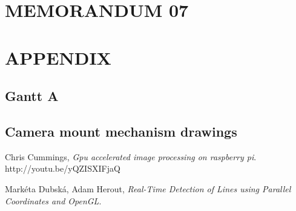 \documentclass[paper=A4, fontsize=11pt, titlepage]{article}
\numberwithin{equation}{section}
\numberwithin{figure}{section}
\numberwithin{table}{section}
\begin{document}
\section{MEMORANDUM 07}




\clearpage


\section{APPENDIX}
\subsection{Gantt A}

\subsection{Camera mount mechanism drawings}



\clearpage

\begin{thebibliography}{9}
	Chris Cummings,
	\emph{Gpu accelerated image processing on raspberry pi}. http://youtu.be/yQZISXIFjaQ

	Markéta Dubská, Adam Herout,
	\emph{Real-Time Detection of Lines using Parallel Coordinates and OpenGL}. 

\end{thebibliography}
\end{document}
